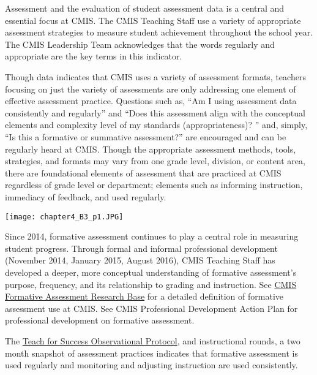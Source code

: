 \begin{findings}
Assessment and the evaluation of student assessment data is a central and essential focus at CMIS. The CMIS Teaching Staff use a variety of appropriate assessment strategies to measure student achievement throughout the school year. The CMIS Leadership Team acknowledges that the words regularly and appropriate are the key terms in this indicator. 

Though data indicates that CMIS uses a variety of assessment formats, teachers focusing on just the variety of assessments are only addressing one element of effective assessment practice. Questions such as, “Am I using assessment data consistently and regularly” and “Does this assessment align with the conceptual elements and complexity level of my standards (appropriateness)? ” and, simply, “Is this a formative or summative assessment?” are encouraged and can be regularly heard at CMIS. Though the appropriate assessment methods, tools, strategies, and formats may vary from one grade level, division, or content area, there are foundational elements of assessment that are practiced at CMIS regardless of grade level or department; elements such as informing instruction, immediacy of feedback, and used regularly. 

{\centering\texttt{[image: chapter4\_B3\_p1.JPG]}}


Since 2014, formative assessment continues to play a central role in measuring student progress. Through formal and informal professional development (November 2014, January 2015, August 2016), CMIS Teaching Staff has developed a deeper, more conceptual understanding of formative assessment’s purpose, frequency, and its relationship to grading and instruction. See \href{https://docs.google.com/document/d/1a7yAmVFIAjZcKHqivOLhF-RYoxJitoF7buq27Ck9sZM/edit?usp=sharing}{CMIS Formative Assessment Research Base} for a detailed definition of formative assessment use at CMIS. See CMIS Professional Development Action Plan for professional development on formative assessment. 

The \href{https://docs.google.com/a/cmis.ac.th/spreadsheets/d/1ACz3l3DPUgIqRhmZ1LWk9RwVBjo0iLsbJAupJoic5Dg/edit?usp=sharing}{Teach for Success Observational Protocol}, and instructional rounds, a two month snapshot of assessment practices indicates that formative assessment is used regularly and monitoring and adjusting instruction are used consistently. 


\end{findings}
